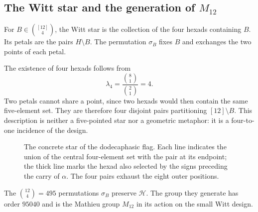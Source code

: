 \subsection{The Witt star and the generation of \texorpdfstring{$M_{12}$}{M12}}
\label{exc:estrella}

\begin{definition}
\label{exc:def-estrella}
For $B\in\binom{[12]}4$, the Witt star is the collection of the
four hexads containing $B$. Its petals are the pairs $H\setminus B$.
The permutation $\sigma_B$ fixes $B$ and exchanges the two points of each
petal.
\end{definition}

The existence of four hexads follows from
\[
 \lambda_4=\frac{\binom81}{\binom21}=4.
\]
Two petals cannot share a point, since two hexads would then
contain the same five-element set. They are therefore four disjoint pairs
partitioning $[12]\setminus B$. This description is neither a five-pointed
star nor a geometric metaphor: it is a four-to-one incidence
of the design.

\begin{figure}[htbp]
\centering
{}
\caption{The concrete star of the dodecaphasic flag. Each line
indicates the union of the central four-element set with the pair at its endpoint; the
thick line marks the hexad also selected by the signs
preceding the carry of $\alpha$. The four pairs exhaust the eight
outer positions.}
\label{exc:fig-estrella}
\end{figure}

\begin{proposition}
\label{exc:m12}
The $\binom{12}4=495$ permutations $\sigma_B$ preserve $\mathcal H$.
The group they generate has order $95040$ and is the Mathieu group
$M_{12}$ in its action on the small Witt design.
\end{proposition}


